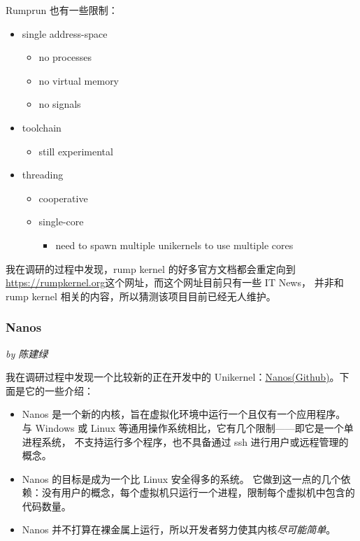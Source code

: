 \documentclass[UTF8,fontset=none,linespread=1.15]{ctexart}
\newcommand{\sectionauthor}[1]{%
\vspace*{-5ex}
\noindent\textrm{\hfill\textit{by #1}}
\vspace*{2ex}\par}
\begin{document}
Rumprun 也有一些限制：

\begin{itemize}
\item single address-space
    \begin{itemize}
    \item no processes
    \item no virtual memory
    \item no signals
    \end{itemize}
\item toolchain
    \begin{itemize}
    \item still experimental
    \end{itemize}
\item threading
    \begin{itemize}
    \item cooperative
    \item single-core
        \begin{itemize}
        \item need to spawn multiple unikernels to use multiple cores
        \end{itemize}
    \end{itemize}
\end{itemize}

我在调研的过程中发现，rump kernel 的好多官方文档都会重定向到
\url{https://rumpkernel.org}这个网址，而这个网址目前只有一些 IT News，
并非和 rump kernel 相关的内容，所以猜测该项目目前已经无人维护。

\subsubsection{Nanos}\sectionauthor{陈建绿}

我在调研过程中发现一个比较新的正在开发中的 Unikernel：\href{https://github.com/nanovms/nanos}{Nanos(Github)}。下面是它的一些介绍：

\begin{itemize}
\item Nanos 是一个新的内核，旨在虚拟化环境中运行一个且仅有一个应用程序。
与 Windows 或 Linux 等通用操作系统相比，它有几个限制——即它是一个单进程系统，
不支持运行多个程序，也不具备通过 ssh 进行用户或远程管理的概念。
\item Nanos 的目标是成为一个比 Linux 安全得多的系统。
它做到这一点的几个依赖：没有用户的概念，每个虚拟机只运行一个进程，限制每个虚拟机中包含的代码数量。
\item Nanos 并不打算在裸金属上运行，所以开发者努力使其内核\textit{尽可能简单}。
\end{itemize}
\end{document}
